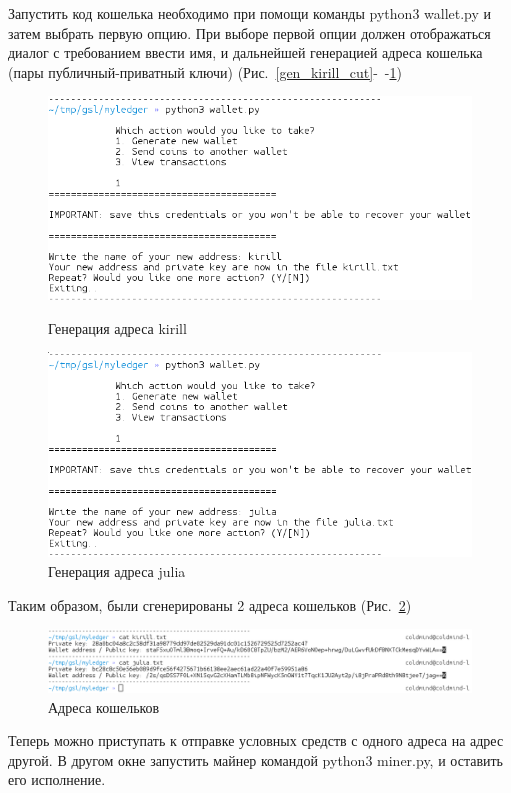 Запустить код кошелька необходимо при помощи команды {\small python3 wallet.py}
и затем выбрать первую опцию. При выборе первой опции должен отображаться
диалог с требованием ввести имя, и дальнейшей генерацией адреса кошелька (пары
публичный-приватный ключи) (Рис.~\ref{gen_kirill_cut}-~-\ref{gen_love})

\begin{figure}[h!]
    \centering
    \includegraphics[width=\textwidth]{./screenshots/gen_kirill_cut}
    \caption{Генерация адреса {\small kirill}}\label{gen_kirill_cut}
    \endminipage\hfill
    \includegraphics[width=\textwidth]{./screenshots/gen_love}
    \caption{Генерация адреса {\small julia}}\label{gen_love}
    \endminipage{}
\end{figure}

Таким образом, были сгенерированы 2 адреса кошельков (Рис.~\ref{cat_hash})
\begin{figure}[h!]
    \centering
    \includegraphics[width=\textwidth]{./screenshots/cat_hash}
    \caption{Адреса кошельков}\label{cat_hash}
\end{figure}
Теперь можно приступать к отправке условных средств с одного адреса на адрес
другой. В другом окне запустить майнер командой {\small python3 miner.py}, и
оставить его исполнение.

